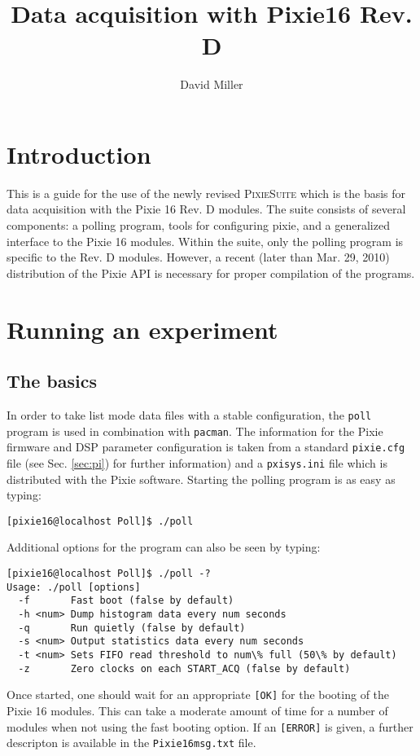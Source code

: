 \documentclass{article}
\title{Data acquisition with Pixie16 Rev. D}
\author{David Miller}
\newcommand{\okay}{\texttt{[OK]}}
\newcommand{\error}{\texttt{[ERROR]}}
\begin{document}
\maketitle
\setcounter{tocdepth}{1}
\setlength{\LTcapwidth}{\textwidth}
\tableofcontents
\section{Introduction}
This is a guide for the use of the newly revised \textsc{PixieSuite} which is the basis for data acquisition with the Pixie 16 Rev. D modules. The suite consists of several components: a polling program, tools for configuring pixie, and a generalized interface to the Pixie 16 modules. Within the suite, only the polling program is specific to the Rev. D modules. However, a recent (later than Mar. 29, 2010) distribution of the Pixie API is necessary for proper compilation of the programs.
\section{Running an experiment}
\subsection{The basics}
In order to take list mode data files with a stable configuration, the \texttt{poll} program is used in combination with \texttt{pacman}. The information for the Pixie firmware and DSP parameter configuration is taken from a standard \texttt{pixie.cfg} file (see Sec. \ref{sec:pi}) for further information) and a \texttt{pxisys.ini} file which is distributed with the Pixie software. Starting the polling program is as easy as typing:
\begin{verbatim}
[pixie16@localhost Poll]$ ./poll
\end{verbatim}
Additional options for the program can also be seen by typing:
\begin{verbatim}
[pixie16@localhost Poll]$ ./poll -?
Usage: ./poll [options]
  -f       Fast boot (false by default)
  -h <num> Dump histogram data every num seconds
  -q       Run quietly (false by default)
  -s <num> Output statistics data every num seconds
  -t <num> Sets FIFO read threshold to num\% full (50\% by default)
  -z       Zero clocks on each START_ACQ (false by default)
\end{verbatim}
Once started, one should wait for an appropriate \okay{} for the booting of the Pixie 16 modules. This can take a moderate amount of time for a number of modules when not using the fast booting option. If an \error{} is given, a further descripton is available in the \texttt{Pixie16msg.txt} file.
\end{document}

